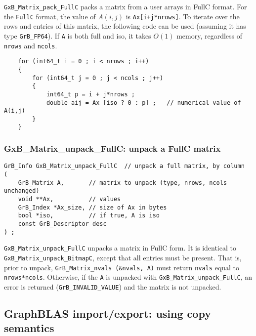 \documentclass[12pt]{article}
\begin{document}
{\verb'GxB_Matrix_pack_FullC' packs a matrix from a user arrays in FullC
format.  For the \verb'FullC' format,
the value of $A(i,j)$ is \verb'Ax[i+j*nrows]'.
To iterate over the rows and entries of this matrix, the following code can be
used (assuming it has type \verb'GrB_FP64').
If \verb'A' is both full and iso, it takes $O(1)$ memory,
regardless of \verb'nrows' and \verb'ncols'.

    \vspace{-0.1in}
    {\footnotesize
    \begin{verbatim}
    for (int64_t i = 0 ; i < nrows ; i++)
    {
        for (int64_t j = 0 ; j < ncols ; j++)
        {
            int64_t p = i + j*nrows ;
            double aij = Ax [iso ? 0 : p] ;   // numerical value of A(i,j)
        }
    } \end{verbatim}}

\subsubsection{{\sf GxB\_Matrix\_unpack\_FullC:} unpack a FullC matrix}
\label{matrix_unpack_fullc}

\begin{mdframed}[userdefinedwidth=6in]
{\footnotesize
\begin{verbatim}
GrB_Info GxB_Matrix_unpack_FullC  // unpack a full matrix, by column
(
    GrB_Matrix A,       // matrix to unpack (type, nrows, ncols unchanged)
    void **Ax,          // values
    GrB_Index *Ax_size, // size of Ax in bytes
    bool *iso,          // if true, A is iso
    const GrB_Descriptor desc
) ;
\end{verbatim}
} \end{mdframed}

\verb'GxB_Matrix_unpack_FullC' unpacks a matrix in FullC form.  It is identical
to \verb'GxB_Matrix_unpack_BitmapC', except that all entries must be present.
That is, prior to unpack, \verb'GrB_Matrix_nvals (&nvals, A)' must return
\verb'nvals' equal to \verb'nrows*ncols'.  Otherwise, if the \verb'A' is
unpacked with \newline \verb'GxB_Matrix_unpack_FullC', an error is returned
(\verb'GrB_INVALID_VALUE') and the matrix is not unpacked.

\newpage
\subsection{GraphBLAS import/export: using copy semantics} %
\label{GrB_import_export}

}
\end{document}

